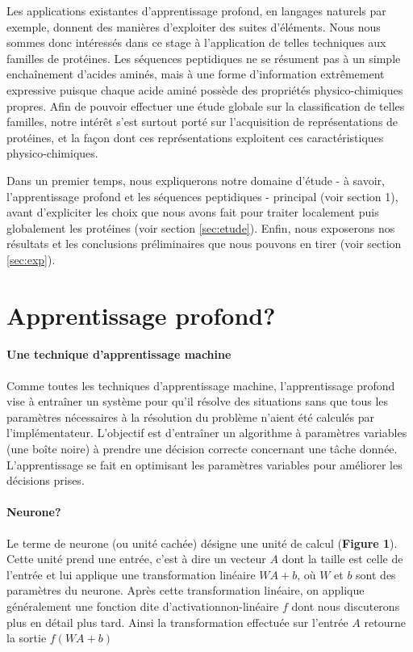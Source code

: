 \documentclass[a4paper, 11pt, onecolumn]{article}
\begin{document}
Les applications existantes d'apprentissage profond, en langages naturels par
exemple, donnent des manières d'exploiter des suites d'éléments.
Nous nous sommes donc intéressés dans ce stage à l'application de telles techniques
aux familles de protéines. Les séquences peptidiques ne se résument pas à un
simple enchaînement d'acides aminés, mais à une forme d'information extrêmement
expressive puisque chaque acide aminé possède des propriétés physico-chimiques
propres. Afin de pouvoir effectuer une étude globale sur la classification de
telles familles, notre intérêt s'est surtout porté sur l'acquisition de
représentations de protéines, et la façon dont ces représentations exploitent
ces caractéristiques physico-chimiques.

Dans un premier temps, nous expliquerons notre domaine d'étude - à savoir,
l'apprentissage profond et les séquences peptidiques - principal (voir section 1), avant d'expliciter les choix que nous avons fait pour traiter
localement puis globalement les protéines (voir section \ref{sec:etude}). Enfin, nous
exposerons nos résultats et les conclusions préliminaires que nous pouvons en
tirer (voir section \ref{sec:exp}).


\section{Apprentissage profond?}
\label{sec:contexte}

\paragraph{Une technique d'apprentissage machine}

Comme toutes les techniques d'apprentissage machine, l'apprentissage profond
vise à entraîner un système pour qu'il résolve des situations sans que tous les
paramètres nécessaires à la résolution du problème n'aient été calculés par
l'implémentateur. L'objectif est d'entraîner un algorithme à paramètres
variables (une \og boîte noire\fg) à prendre une décision correcte concernant
une tâche donnée. L'apprentissage se fait en optimisant les paramètres variables
pour améliorer les décisions prises.

\paragraph{Neurone?}

Le terme de neurone (ou unité cachée) désigne une unité de calcul (\textbf{Figure 1}). Cette unité prend
une entrée, c'est à dire un vecteur $A$ dont la taille est celle de l'entrée et lui
applique une transformation linéaire $WA + b$, où $W$ et $b$ sont des paramètres
du neurone. Après cette transformation linéaire, on applique généralement une
fonction dite \og d'activation\fg non-linéaire $f$ dont nous discuterons plus en
détail plus tard. Ainsi la transformation effectuée sur l'entrée $A$ retourne la
sortie $f(WA + b)$
\end{document}
